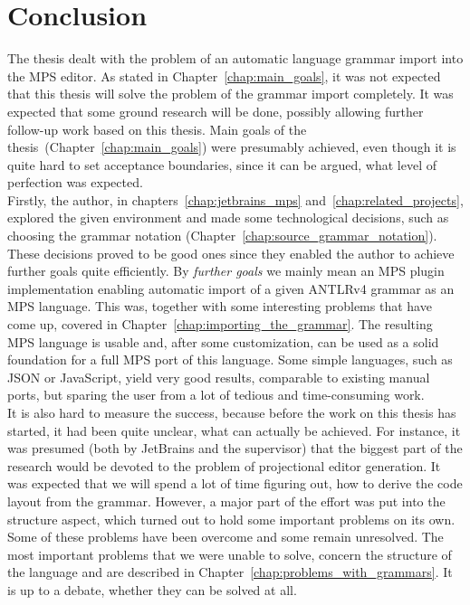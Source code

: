\chapter{Conclusion}

The thesis dealt with the problem of an automatic language grammar import into the MPS editor.
As stated in Chapter~\ref{chap:main_goals}, it was not expected that this thesis will solve the problem of the grammar import completely.
It was expected that some ground research will be done, possibly allowing further follow-up work based on this thesis.
Main goals of the thesis~(Chapter~\ref{chap:main_goals}) were presumably achieved, even though it is quite hard to set acceptance boundaries, since it can be argued, what level of perfection was expected.
\\

Firstly, the author, in chapters~\ref{chap:jetbrains_mps} and~\ref{chap:related_projects}, explored the given environment and made some technological decisions, such as choosing the grammar notation (Chapter~\ref{chap:source_grammar_notation}).
These decisions proved to be good ones since they enabled the author to achieve further goals quite efficiently.
By \textit{further goals} we mainly mean an MPS plugin implementation enabling automatic import of a given ANTLRv4 grammar as an MPS language. This was, together with some interesting problems that have come up, covered in Chapter~\ref{chap:importing_the_grammar}.
The resulting MPS language is usable and, after some customization, can be used as a solid foundation for a full MPS port of this language.
Some simple languages, such as JSON or JavaScript, yield very good results, comparable to existing manual ports, but sparing the user from a lot of tedious and time-consuming work.
\\

It is also hard to measure the success, because before the work on this thesis has started, it had been quite unclear, what can actually be achieved.
For instance, it was presumed (both by JetBrains and the supervisor) that the biggest part of the research would be devoted to the problem of projectional editor generation.
It was expected that we will spend a lot of time figuring out, how to derive the code layout from the grammar.
However, a major part of the effort was put into the structure aspect, which turned out to hold some important problems on its own.
Some of these problems have been overcome and some remain unresolved.
The most important problems that we were unable to solve, concern the structure of the language and are described in Chapter~\ref{chap:problems_with_grammars}.
It is up to a debate, whether they can be solved at all.
\\

